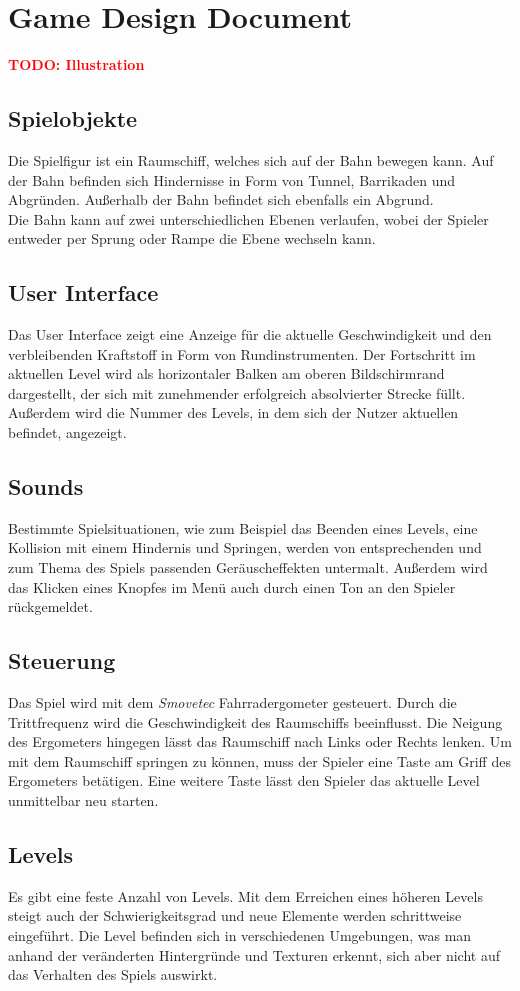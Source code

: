 \section{Game Design Document}

\textcolor{red}{\textbf{TODO: Illustration}}

\subsection{Spielobjekte}
Die Spielfigur ist ein Raumschiff, welches sich auf der Bahn bewegen kann. Auf der Bahn befinden sich Hindernisse in Form von Tunnel, Barrikaden und Abgründen. Außerhalb der Bahn befindet sich ebenfalls ein Abgrund.\\
Die Bahn kann auf zwei unterschiedlichen Ebenen verlaufen, wobei der Spieler entweder per Sprung oder Rampe die Ebene wechseln kann.

\subsection{User Interface}
Das User Interface zeigt eine Anzeige für die aktuelle Geschwindigkeit und den verbleibenden Kraftstoff in Form von Rundinstrumenten. Der Fortschritt im aktuellen Level wird als horizontaler Balken am oberen Bildschirmrand dargestellt, der sich mit zunehmender erfolgreich absolvierter Strecke füllt. Außerdem wird die Nummer des Levels, in dem sich der Nutzer aktuellen befindet, angezeigt.

\subsection{Sounds}
Bestimmte Spielsituationen, wie zum Beispiel das Beenden eines Levels, eine Kollision mit einem Hindernis und Springen, werden von entsprechenden und zum Thema des Spiels passenden Geräuscheffekten untermalt. Außerdem wird das Klicken eines Knopfes im Menü auch durch einen Ton an den Spieler rückgemeldet.

\subsection{Steuerung}
Das Spiel wird mit dem \textit{Smovetec} Fahrradergometer gesteuert. Durch die Trittfrequenz wird die Geschwindigkeit des Raumschiffs beeinflusst. Die Neigung des Ergometers hingegen lässt das Raumschiff nach Links oder Rechts lenken. Um mit dem Raumschiff springen zu können, muss der Spieler eine Taste am Griff des Ergometers betätigen. Eine weitere Taste lässt den Spieler das aktuelle Level unmittelbar neu starten.

\subsection{Levels}
Es gibt eine feste Anzahl von Levels. Mit dem Erreichen eines höheren Levels steigt auch der Schwierigkeitsgrad und neue Elemente werden schrittweise eingeführt. Die Level befinden sich in verschiedenen Umgebungen, was man anhand der veränderten Hintergründe und Texturen erkennt, sich aber nicht auf das Verhalten des Spiels auswirkt.